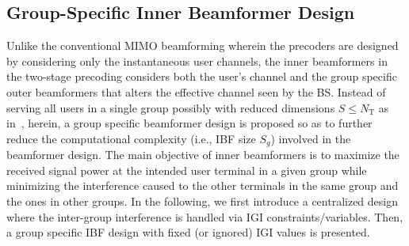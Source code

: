 \documentclass[letterpaper,conference,10pt]{IEEEtran}
\begin{document}
	\subsection{Group-Specific Inner Beamformer Design}	\label{inpre}
	Unlike the conventional \ac{MIMO} beamforming wherein the precoders are designed by considering only the instantaneous user channels, the inner beamformers in the two-stage precoding considers both the user's channel and the group specific outer beamformers that alters the effective channel seen by the \ac{BS}.	Instead of serving all users in a single group possibly with reduced dimensions $S\leq N_{\mathrm T}$ as in~\cite{arvola2016two}, herein, a group specific beamformer design is proposed so as to further reduce the computational complexity (i.e., \ac{IBF} size $S_g$) involved in the beamformer design. The main objective of inner beamformers is to maximize the received signal power at the intended user terminal in a given group while minimizing the interference caused to the other terminals in the same group and the ones in other groups. In the following, we first introduce a centralized design where the inter-group interference is handled via \ac{IGI} constraints/variables. Then, a group specific \ac{IBF} design with fixed (or ignored) \ac{IGI} values is presented.
\end{document}
